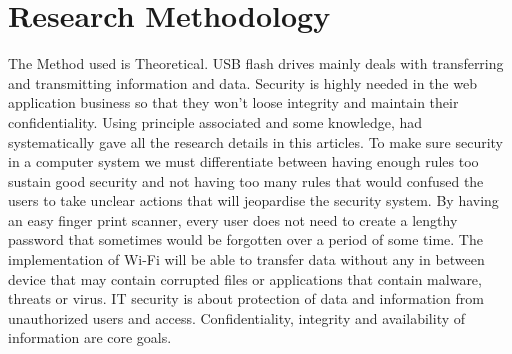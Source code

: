 \documentclass[a4paper,12pt]{article}
\begin{document}
\section{Research Methodology}
The Method used is Theoretical. USB flash drives mainly deals with transferring and transmitting information and data. Security is highly needed in the web application business so that they won't loose integrity and maintain their confidentiality. Using principle associated and some knowledge, had systematically gave all the research details in this articles. To make sure security in a computer system we must differentiate between having enough rules too sustain good security and not having too many rules that would confused the users to take unclear actions that will jeopardise the security system. By having an easy finger print scanner, every user does not need to create a lengthy password that sometimes would be forgotten over a period of some time. The implementation of Wi-Fi will be able to transfer data without any in between device that may contain corrupted files or applications that contain malware, threats or virus. IT security is about protection of data and information from unauthorized users and access. Confidentiality, integrity and availability of information are core goals.


 
\end{document}
